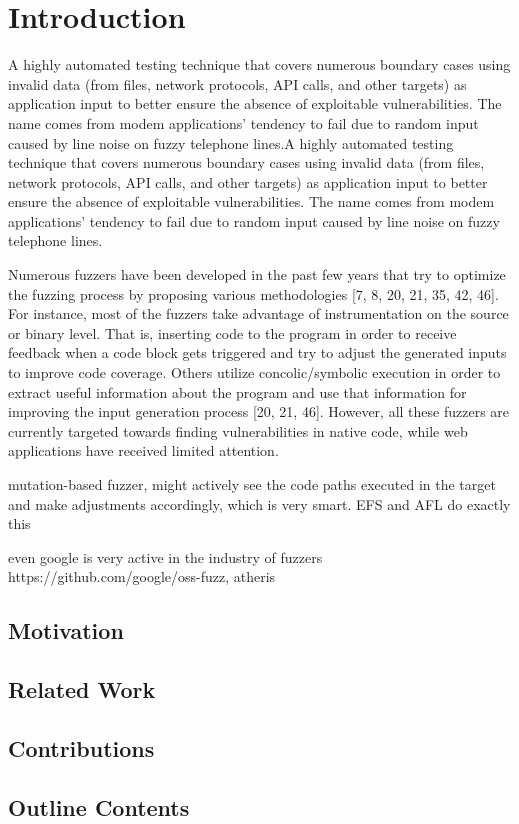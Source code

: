 \chapter{Introduction}
\minitoc
\vspace*{1cm}

A highly automated testing technique that covers numerous boundary cases
using invalid data (from files, network protocols, API calls, and other targets)
as application input to better ensure the absence of exploitable vulnerabilities.
The name comes from modem applications’ tendency to fail due
to random input caused by line noise on fuzzy telephone lines.A highly automated testing technique that covers numerous boundary cases
using invalid data (from files, network protocols, API calls, and other targets)
as application input to better ensure the absence of exploitable vulnerabilities.
The name comes from modem applications’ tendency to fail due
to random input caused by line noise on fuzzy telephone lines.


Numerous fuzzers have been developed in the past few
years that try to optimize the fuzzing process by proposing
various methodologies [7, 8, 20, 21, 35, 42, 46]. For instance,
most of the fuzzers take advantage of instrumentation on
the source or binary level. That is, inserting code to the
program in order to receive feedback when a code block gets
triggered and try to adjust the generated inputs to improve
code coverage. Others utilize concolic/symbolic execution
in order to extract useful information about the program
and use that information for improving the input generation
process [20, 21, 46]. However, all these fuzzers are currently
targeted towards finding vulnerabilities in native code, while
web applications have received limited attention.


mutation-based fuzzer, might actively see the code paths executed in the target and make adjustments accordingly, which is very smart. EFS and AFL do exactly this

even google is very active in the industry of fuzzers https://github.com/google/oss-fuzz, atheris
\section{Motivation}

\section{Related Work}

\section{Contributions}

\section{Outline Contents}
